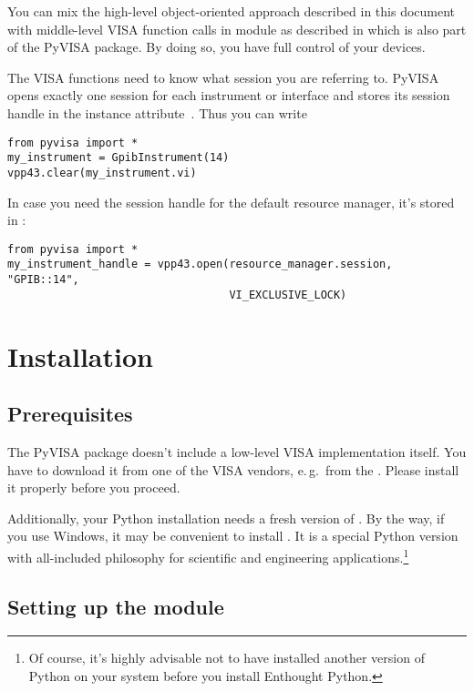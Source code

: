 \documentclass{howto}
\begin{document}
You can mix the high-level object-oriented approach described in this document
with middle-level VISA function calls in module  as described in
 which is also part of the PyVISA package.  By doing so, you
have full control of your devices.

The VISA functions need to know what session you are referring to.  PyVISA
opens exactly one session for each instrument or interface and stores its
session handle in the instance attribute~.  Thus you can write
\begin{verbatim}
from pyvisa import *
my_instrument = GpibInstrument(14)
vpp43.clear(my_instrument.vi)
\end{verbatim}

In case you need the session handle for the default resource manager, it's
stored in :
\begin{verbatim}
from pyvisa import *
my_instrument_handle = vpp43.open(resource_manager.session, "GPIB::14",
                                  VI_EXCLUSIVE_LOCK)
\end{verbatim}

\section{Installation}

\subsection{Prerequisites}

The PyVISA package doesn't include a low-level VISA implementation itself.  You
have to download it from one of the VISA vendors, e.\,g.\ from the
.  Please install
it properly before you proceed.

Additionally, your Python installation needs a fresh version of
.  By the way,
if you use Windows, it may be convenient to install .  It is a special Python version
with all-included philosophy for scientific and engineering
applications.\footnote{Of course, it's highly advisable not to have installed
  another version of Python on your system before you install Enthought
  Python.}


\subsection{Setting up the module}
\end{document}
